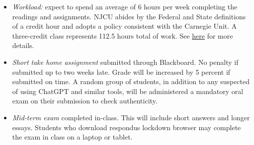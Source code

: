 \documentclass[article,oneside]{memoir}
\begin{document}
\begin{itemize}


\item \textit{Workload:} expect to spend an average of 6 hours per week completing the readings and assignments. NJCU abides by the Federal and State definitions of a credit hour and adopts a policy consistent with the Carnegie Unit. A three-credit class represents 112.5 hours total of work. See \href{http://scottoconnor.org/resources/Credit.pdf}{here} for more details.







\item \textit{Short take home assignment} submitted through Blackboard. No penalty if submitted up to two weeks late. Grade will be increased by 5 percent if submitted on time. A random group of students, in addition to any suspected of using ChatGPT and similar tools, will be administered a mandatory oral exam on their submission to check authenticity.  

\item \textit{Mid-term exam} completed in-class. This will include short answers and longer essays. Students who download respondus lockdown browser may complete the exam in class on a laptop or tablet. 




\end{itemize}
\end{document}
